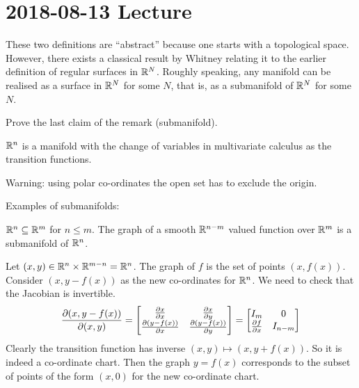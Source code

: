 \section{2018-08-13 Lecture}

\begin{rmk}[2.3]
  These two definitions are ``abstract'' because one starts with a topological space.
  However, there exists a classical result by Whitney relating it to the earlier definition of regular surfaces in $\mathbb{R}^N$.
  Roughly speaking, any manifold can be realised as a surface in $\mathbb{R}^N$ for some $N$, that is, as a submanifold of $\mathbb{R}^N$ for some $N$.
\end{rmk}

\begin{exer}
  Prove the last claim of the remark (submanifold).
\end{exer}

\begin{exer}[2.4]
  $\mathbb{R}^n$ is a manifold with the change of variables in multivariate calculus as the transition functions.
  
  Warning: using polar co-ordinates the open set has to exclude the origin.
\end{exer}

\begin{exam}
  Examples of submanifolds:
  \begin{itm}
    \io $\mathbb{R}^n \subseteq \mathbb{R}^m$ for $n \leq m$.
    \io The graph of a smooth $\mathbb{R}^{n-m}$ valued function over $\mathbb{R}^m$ is a submanifold of $\mathbb{R}^n$.

    Let $(x,y) \in \mathbb{R}^n \times \mathbb{R}^{m-n} = \mathbb{R}^n$.
    The graph of $f$ is the set of points $(x,f(x))$.
    Consider $(x,y-f(x))$ as the new co-ordinates for $\mathbb{R}^n$.
    We need to check that the Jacobian is invertible.
    \begin{equation*}
      \frac{\partial(x,y-f(x))}{\partial(x,y)}=
      \begin{bmatrix}
	\frac{\partial x}{\partial x} & \frac{\partial x}{\partial y} \\
	\frac{\partial(y-f(x))}{\partial x} & \frac{\partial(y-f(x))}{\partial y}
      \end{bmatrix}
      =
      \begin{bmatrix}
	I_m & 0 \\
	\frac{\partial f}{\partial x} & I_{n-m}
      \end{bmatrix}
    \end{equation*}
    Clearly the transition function has inverse $(x,y) \mapsto (x,y+f(x))$.
    So it is indeed a co-ordinate chart.
    Then the graph $y=f(x)$ corresponds to the subset of points of the form $(x,0)$ for the new co-ordinate chart.
  \end{itm}
\end{exam}

